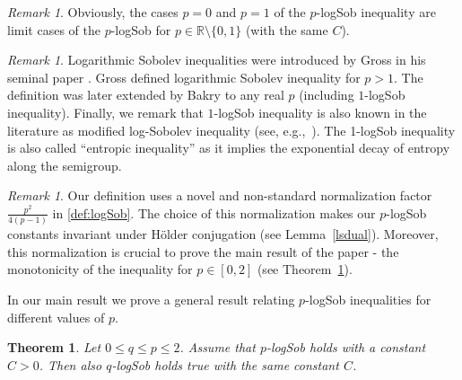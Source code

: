 \documentclass[11pt]{amsart}
\newcommand{\R}{\mathbb{R}}
\newcommand{\E}{\mathbb{E}}
\newcommand{\1}{\mathbf{1}}
\def\R{{\mathbb R}}
\def\E{{\mathbb E}}
\theoremstyle{definition}
\theoremstyle{plain}
\newtheorem{theorem}[example]{Theorem}
\theoremstyle{remark}
\newtheorem{remark}[example]{Remark}
\numberwithin{equation}{section}
\begin{document}
\begin{remark}
Obviously, the cases $p=0$ and $p=1$ of the $p$-logSob inequality are limit cases of the $p$-logSob for
$p \in \R \setminus \{ 0,1\}$ (with the same $C$). 

\end{remark}

\begin{remark}
Logarithmic Sobolev inequalities were introduced by Gross in his seminal paper \cite{Gross:75}. Gross defined logarithmic Sobolev inequality for $p>1$. The definition was later extended by Bakry \cite{Bakry:94} to any real $p$ (including $1$-logSob inequality). %
Finally, we remark that $1$-logSob inequality is also known in the literature as modified log-Sobolev inequality (see, e.g.,~\cite{Wu00, Quastel03,  Goel04,  BobkovTetali06}). The 1-logSob inequality is also called ``entropic inequality'' as it implies  the exponential decay of entropy along the semigroup.
\end{remark}

\begin{remark}
Our definition uses a novel and non-standard normalization factor $\frac{p^{2}}{4(p-1)}$  in \eqref{def:logSob}. 
The choice of this normalization makes our $p$-logSob constants invariant under H\"{o}lder conjugation (see Lemma~\ref{lsdual}).  Moreover, this normalization is crucial to prove  the main result of the paper - 
the monotonicity of the inequality for  $p \in [0, 2]$ (see Theorem~\ref{monotone}).  
\end{remark}


In our main result we prove a  general result relating $p$-logSob inequalities for different values of $p$.

\begin{theorem} \label{monotone}
Let $0 \leq q \leq p \leq 2$. Assume that $p$-logSob holds with a constant $C>0$. Then also $q$-logSob holds true
with the same constant $C$.
\end{theorem}
\end{document}
